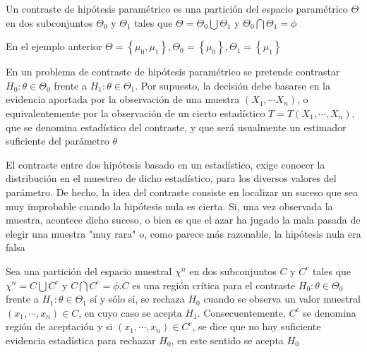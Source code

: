 \begin{definición} 
Un contraste de hipótesis paramétrico es una partición del espacio paramétrico $\Theta$ en dos subconjuntos $\Theta_{0}$ y $\Theta_{1}$ tales que $\Theta=\Theta_{0} \bigcup \Theta_{1}$ y $\Theta_{0} \bigcap \Theta_{1}=\phi$
\end{definición}

En el ejemplo anterior $\Theta=\left\{\mu_{0}, \mu_{1}\right\}, \Theta_{0}=\left\{\mu_{0}\right\}, \Theta_{1}=\left\{\mu_{1}\right\}$

En un problema de contraste de hipótesis paramétrico se pretende contrastar $H_{0}: \theta \in \Theta_{0}$ frente a $H_{1}: \theta \in \Theta_{1}$. Por supuesto, la decisión debe basarse en la evidencia aportada por la observación de una muestra $\left(X_{1}, \cdots X_{n}\right)$, o equivalentemente por la observación de un cierto estadístico $T=T\left(X_{1}, \cdots, X_{n}\right)$, que se denomina estadístico del contraste, y que será usualmente un estimador suficiente del parámetro $\theta$

El contraste entre dos hipótesis basado en un estadístico, exige conocer la distribución en el muestreo de dicho estadístico, para los diversos valores del parámetro. De hecho, la idea del contraste consiste en localizar un suceso que sea muy improbable cuando la hipótesis nula es cierta. Si, una vez observada la muestra, acontece dicho suceso, o bien es que el azar ha jugado la mala pasada de elegir una muestra "muy rara" o, como parece más razonable, la hipótesis nula era falsa

\begin{definición} 
Sea una partición del espacio muestral $\chi^{n}$ en dos subconjuntos $C$ y $C^{c}$ tales que $\chi^{n}=C \bigcup C^{c}$ y $C \bigcap C^{c}=\phi . C$ es una región crítica para el contraste $H_{0}: \theta \in \Theta_{0}$ frente a $H_{1}: \theta \in \Theta_{1}$ sí y sólo sí, se rechaza $H_{0}$ cuando se observa un valor muestral $\left(x_{1}, \cdots, x_{n}\right) \in C$, en cuyo caso se acepta $H_{1}$. Consecuentemente, $C^{c}$ se denomina región de aceptación y si $\left(x_{1}, \cdots, x_{n}\right) \in C^{c}$, se dice que no hay suficiente evidencia estadística para rechazar $H_{0}$, en este sentido se acepta $H_{0}$
\end{definición}



